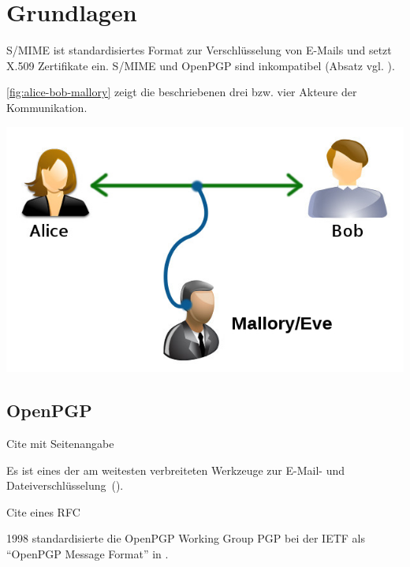 \chapter{Grundlagen}

S/MIME ist standardisiertes Format zur Verschlüsselung von E-Mails und setzt X.509 Zertifikate ein. S/MIME und OpenPGP sind inkompatibel (Absatz vgl. \cite[S. 667f]{book:kryptoschmeh}).


\vref{fig:alice-bob-mallory} zeigt die beschriebenen drei bzw. vier Akteure der Kommunikation.

\begin{minipage}[c]{\textwidth}
	\includegraphics{res/Alice-bob-eve}
	\label{fig:alice-bob-mallory}
\end{minipage}


\section{OpenPGP}\label{openpgp}
\begin{formal}
	Cite mit Seitenangabe
\end{formal}
Es ist eines der am weitesten verbreiteten Werkzeuge zur E-Mail- und Dateiverschlüsselung~(\cite[S. 995]{book:cyclocryptosec}).

\begin{formal}
	Cite eines RFC
\end{formal}
1998 standardisierte die OpenPGP Working Group PGP bei der \gls{IETF} als "`OpenPGP Message Format"' in \cite{rfc4880}.

